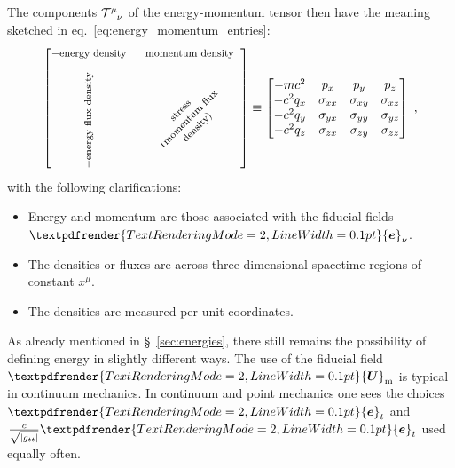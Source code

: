 \documentclass[\ifafour a4paper,12pt,\else a5paper,10pt,\fi%
onecolumn,oneside,article,%
british%
]{memoir}
\renewcommand*{\bm}[1]{\textpdfrender{TextRenderingMode=2,LineWidth=0.1pt}{\boldsymbol{#1}}}
\DeclarePairedDelimiter\abs{\lvert}{\rvert}
\renewcommand*{\|}[1][]{\nonscript\:#1\vert\nonscript\:\mathopen{}}
\newcommand*{\sect}{\S}%
\newcommand*{\eqn}{eq.}%
\renewcommand*{\i}{{}\indices}
\newcommand*{\ve}[1]{\bm{e}_{#1}}
\newcommand*{\yT}{\mathcal{T}}
\newcommand*{\yU}{\bm{U}}
\newcommand*{\yUm}{\yU_{\textrm{m}}}
\begin{document}
The components $\yT\i{^{\mu}_{\nu}}$ of the energy-momentum tensor then have the meaning sketched in \eqn~\eqref{eq:energy_momentum_entries}:
\begin{equation}
  \label{eq:energy_momentum_entries_correct}
  \begin{bmatrix}
    \text{\footnotesize $-$energy density} &
    \text{\footnotesize momentum density} \\[2\jot]
    \rotatebox[origin=c]{90}{\text{\footnotesize $-$energy flux density}} &
    \rotatebox[origin=c]{45}{\parbox{9em}{\centering\footnotesize stress\\ (momentum flux density)}}
  \end{bmatrix}
  \equiv
    \begin{bmatrix}
    -m c^{2} & p_{x} & p_{y} & p_{z}
    \\
    -c^{2} q_{x} & \sigma_{xx} & \sigma_{xy} & \sigma_{xz}
    \\
    -c^{2} q_{y} & \sigma_{yx} & \sigma_{yy} & \sigma_{yz}
    \\
    -c^{2} q_{z} & \sigma_{zx} & \sigma_{zy} & \sigma_{zz}
  \end{bmatrix}
\ ,
\end{equation}
with the following clarifications:
\begin{itemize}[noitemsep]
\item Energy and momentum are those associated with the fiducial fields $\ve{\nu}$.
\item The densities or fluxes are across three-dimensional spacetime regions of constant $x^{\mu}$.
\item The densities are measured per unit coordinates.
\end{itemize}


As already mentioned in \sect~\ref{sec:energies}, there still remains the possibility of defining energy in slightly different ways. The use of the fiducial field $\yUm$ is typical in continuum mechanics. In continuum and point mechanics one sees the choices $\ve{t}$ and $\tfrac{c}{\sqrt{\abs{g_{tt}}}}\ve{t}$ used equally often.

\medskip
\end{document}
